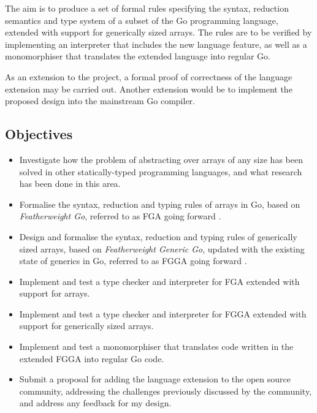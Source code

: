 The aim is to produce a set of formal rules specifying the syntax, reduction
semantics and type system of a subset of the Go programming language, extended
with support for generically sized arrays. The rules are to be verified by
implementing an interpreter that includes the new language feature, as well
as a monomorphiser that translates the extended language into regular Go.

As an extension to the project, a formal proof of correctness of the language
extension may be carried out. Another extension would be to implement the
proposed design into the mainstream Go compiler.

\subsection{Objectives}

\begin{itemize}
      \item Investigate how the problem of abstracting over arrays of any size
            has been solved in other statically-typed programming languages, and
            what research has been done in this area.
      \item Formalise the syntax, reduction and typing rules of arrays in Go,
            based on \emph{Featherweight Go}, referred to as FGA going forward
            \autocite{fg}.
      \item Design and formalise the syntax, reduction and typing rules of
            generically sized arrays, based on \emph{Featherweight Generic Go},
            updated with the existing state of generics in Go, referred to as
            FGGA going forward \autocite{fg}.
      \item Implement and test a type checker and interpreter for FGA extended
            with support for arrays.
      \item Implement and test a type checker and interpreter for FGGA extended
            with support for generically sized arrays.
      \item Implement and test a monomorphiser that translates code written in
            the extended FGGA into regular Go code.
      \item Submit a proposal for adding the language extension to the open
            source community, addressing the challenges previously discussed by
            the community, and address any feedback for my design.
\end{itemize}

